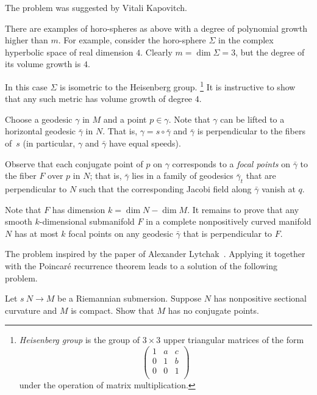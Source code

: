 The problem was suggested by Vitali Kapovitch.

There are examples of horo-spheres as above with a degree of polynomial growth higher than $m$.
For example, consider the horo-sphere $\Sigma$ in the complex hyperbolic space 
of real dimension $4$.
Clearly $m=\dim \Sigma=3$, but the degree of its volume growth is $4$.

In this case $\Sigma$ is isometric to the Heisenberg group.%
\footnote{\emph{Heisenberg group}
is the group of $3\times3$ upper triangular matrices of the form
\[\begin{pmatrix}
 1 & a & c\\
 0 & 1 & b\\
 0 & 0 & 1\\
\end{pmatrix}\]
under the operation of matrix multiplication.} 
It is instructive to show that any such metric has volume  growth of degree $4$.

Choose a geodesic $\gamma$ in $M$ and a point $p\in \gamma$.
Note that $\gamma$ can be lifted to a horizontal geodesic $\bar\gamma$ in $N$.
That is, $\gamma=s\circ\bar\gamma$ and $\bar\gamma$ is perpendicular to the fibers of~$s$ (in particular, $\gamma$ and $\bar\gamma$ have equal speeds).

Observe that each conjugate point of $p$ on $\gamma$ corresponds to a \emph{focal points} on $\bar\gamma$ to the fiber $F$ over $p$ in $N$;
that is, $\bar\gamma$ lies in a family of geodesics $\bar\gamma_t$ that are perpendicular to $N$ 
such that the corresponding Jacobi field along $\bar\gamma$ vanish at $q$.

Note that $F$ has dimension $k=\dim N-\dim M$.
It remains to prove that any smooth $k$-dimensional submanifold $F$ in a complete nonpositively curved manifold $N$ has at most $k$ focal points on any geodesic $\bar \gamma$ that is perpendicular to $F$.\qeds

The problem inspired by the paper of Alexander Lytchak~\cite{lytchak:conjugate}.
Applying it together with the Poincar\'e recurrence theorem
leads to a solution of the following problem.

\begin{pr}
Let $s\:N\to M$ be a Riemannian submersion.
Suppose $N$ has nonpositive sectional curvature and $M$ is compact.
Show that $M$ has no conjugate points.
\end{pr}

